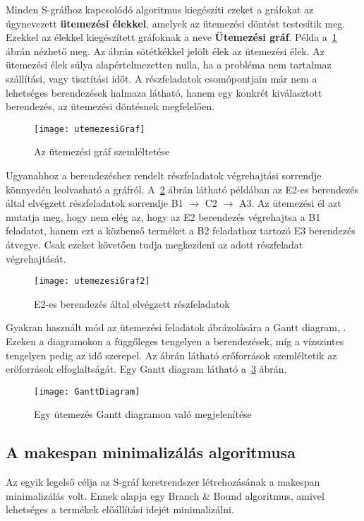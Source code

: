 Minden S-gráfhoz kapcsolódó algoritmus kiegészíti ezeket a gráfokat az úgynevezett \textbf{ütemezési élekkel}, amelyek az ütemezési döntést testesítik meg. Ezekkel az élekkel kiegészített gráfoknak a neve \textbf{Ütemezési gráf}. Példa a~\ref{utemezesiGraf} ábrán nézhető meg. Az ábrán sötétkékkel jelölt élek az ütemezési élek. Az ütemezési élek súlya alapértelmezetten nulla, ha a probléma nem tartalmaz szállítási, vagy tisztítási időt. A részfeladatok csomópontjain már nem a lehetséges berendezések halmaza látható, hanem egy konkrét kiválasztott berendezés, az ütemezési döntésnek megfelelően. 
\begin{figure}[H]
\begin{center}
\texttt{[image: utemezesiGraf]}
\caption{Az ütemezési gráf szemléltetése}
\label{utemezesiGraf}
\end{center}
\end{figure}
Ugyanahhoz a berendezéshez rendelt részfeladatok végrehajtási sorrendje könnyedén leolvasható a gráfról. A~\ref{utemezesiGraf2} ábrán látható példában az E2-es berendezés által elvégzett részfeladatok sorrendje B1 $\to$ C2 $\to$ A3. Az ütemezési él azt mutatja meg, hogy nem elég az, hogy az E2 berendezés végrehajtsa a B1 feladatot, hanem ezt a közbenső terméket a B2 feladathoz tartozó E3 berendezés átvegye. Csak ezeket követően tudja megkezdeni az adott részfeladat végrehajtását.
\begin{figure}[H]
\begin{center}
\texttt{[image: utemezesiGraf2]}
\caption{E2-es berendezés által elvégzett részfeladatok}
\label{utemezesiGraf2}
\end{center}
\end{figure}
Gyakran használt mód az ütemezési feladatok ábrázolására a Gantt diagram\cite{ganttwwf}, \cite{ganttofw}. Ezeken a diagramokon a függőleges tengelyen a berendezések, míg a vízszintes tengelyen pedig az idő szerepel. Az ábrán látható erőforrások szemléltetik az erőforrások elfoglaltságát. Egy Gantt diagram látható a~\ref{GanttDiagram} ábrán.
\begin{figure}[H]
\begin{center}
\texttt{[image: GanttDiagram]}
\caption{Egy ütemezés Gantt diagramon való megjelenítése}
\label{GanttDiagram}
\end{center}
\end{figure}

\subsection{A makespan minimalizálás algoritmusa}
Az egyik legelső célja az S-gráf keretrendszer létrehozásának a makespan minimalizálás volt. Ennek alapja egy Branch \& Bound algoritmus, amivel lehetséges a termékek előállítási idejét minimalizálni.

